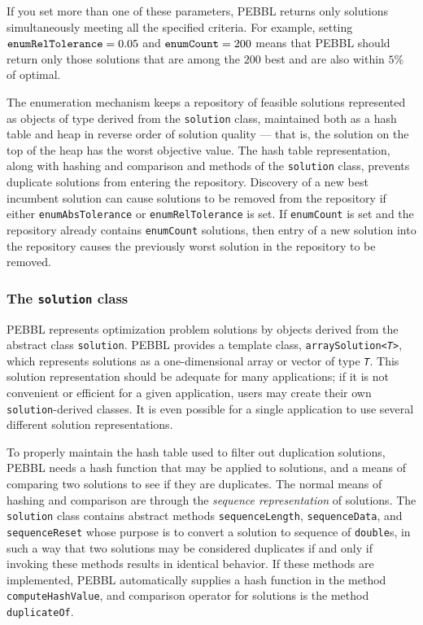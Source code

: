 If you set more than one of these parameters, PEBBL returns only
solutions simultaneously meeting all the specified criteria.  For
example, setting $\text{\texttt{enumRelTolerance}}=0.05$ and
$\text{\texttt{enumCount}}=200$ means that PEBBL should return only
those solutions that are among the $200$ best and are also within
$5$\% of optimal.

The enumeration mechanism keeps a repository of feasible solutions
represented as objects of type derived from the \texttt{solution}
class, maintained both as a hash table and heap in reverse order of
solution quality --- that is, the solution on the top of the heap has
the worst objective value.  The hash table representation, along with
hashing and comparison and methods of the \texttt{solution} class,
prevents duplicate solutions from entering the repository.  Discovery
of a new best incumbent solution can cause solutions to be removed
from the repository if either \texttt{enumAbsTolerance} or
\texttt{enumRelTolerance} is set.  If \texttt{enumCount} is set and
the repository already contains \texttt{enumCount} solutions, then
entry of a new solution into the repository causes the previously
worst solution in the repository to be removed.


\subsubsection{The \texttt{solution} class}
\label{sec:solclass}
PEBBL represents optimization problem solutions by objects derived
from the abstract class \texttt{solution}.  PEBBL provides a template
class, \texttt{arraySolution<\emph{T}>}, which represents solutions as a
one-dimensional array or vector of type \texttt{\emph{T}}.  This solution
representation should be adequate for many applications; if it is not
convenient or efficient for a given application, users may create
their own \texttt{solution}-derived classes.  It is even possible for
a single application to use several different solution
representations.

To properly maintain the hash table used to filter out duplication
solutions, PEBBL needs a hash function that may be applied to
solutions, and a means of comparing two solutions to see if they are
duplicates.  The normal means of hashing and comparison are through
the \emph{sequence representation} of solutions.  The
\texttt{solution} class contains abstract methods
\texttt{sequenceLength}, \texttt{sequenceData}, and
\texttt{sequenceReset} whose purpose is to convert a solution to
sequence of \texttt{double}s, in such a way that two solutions may be
considered duplicates if and only if invoking these methods results in identical
behavior.  If these methods are implemented, PEBBL automatically
supplies a hash function in the method \texttt{computeHashValue}, and
comparison operator for solutions is the method \texttt{duplicateOf}.

